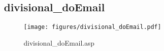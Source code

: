 \subsection{divisional\_doEmail}
\begin{figure}[htb]
    \begin{center}
        \texttt{[image: figures/divisional\_doEmail.pdf]}
    \end{center}
    \caption{divisional\_doEmail.asp}
    \label{fig:divisional_doEmail}
\end{figure}
